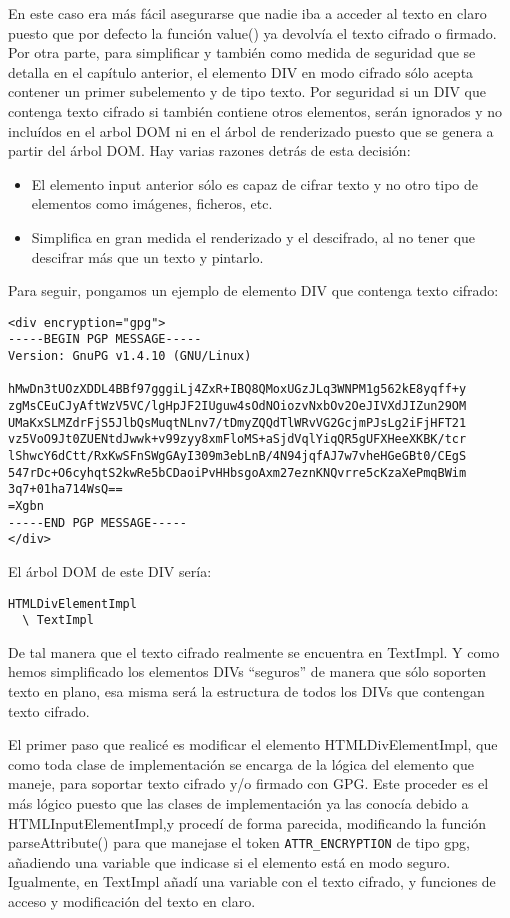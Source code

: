 En este caso era más fácil asegurarse que nadie iba a acceder al texto en claro puesto que por defecto la función value() ya devolvía el texto cifrado o firmado. Por otra parte, para simplificar y también como medida de seguridad que se detalla en el capítulo anterior, el elemento DIV en modo cifrado sólo acepta contener un primer subelemento y de tipo texto. Por seguridad si un DIV que contenga texto cifrado si también contiene otros elementos, serán ignorados y no incluídos en el arbol DOM ni en el árbol de renderizado puesto que se genera a partir del árbol DOM. Hay varias razones detrás de esta decisión:

\begin{itemize}
 \item El elemento input anterior sólo es capaz de cifrar texto y no otro tipo de elementos como imágenes, ficheros, etc.
 \item Simplifica en gran medida el renderizado y el descifrado, al no tener que descifrar más que un texto y pintarlo.
\end{itemize}

Para seguir, pongamos un ejemplo de elemento DIV que contenga texto cifrado:

\begin{verbatim}
<div encryption="gpg">
-----BEGIN PGP MESSAGE-----
Version: GnuPG v1.4.10 (GNU/Linux)

hMwDn3tUOzXDDL4BBf97gggiLj4ZxR+IBQ8QMoxUGzJLq3WNPM1g562kE8yqff+y
zgMsCEuCJyAftWzV5VC/lgHpJF2IUguw4sOdNOiozvNxbOv2OeJIVXdJIZun29OM
UMaKxSLMZdrFjS5JlbQsMuqtNLnv7/tDmyZQQdTlWRvVG2GcjmPJsLg2iFjHFT21
vz5VoO9Jt0ZUENtdJwwk+v99zyy8xmFloMS+aSjdVqlYiqQR5gUFXHeeXKBK/tcr
lShwcY6dCtt/RxKwSFnSWgGAyI309m3ebLnB/4N94jqfAJ7w7vheHGeGBt0/CEgS
547rDc+O6cyhqtS2kwRe5bCDaoiPvHHbsgoAxm27eznKNQvrre5cKzaXePmqBWim
3q7+01ha714WsQ==
=Xgbn
-----END PGP MESSAGE-----
</div>
\end{verbatim} 

El árbol DOM de este DIV sería:

\begin{verbatim}
HTMLDivElementImpl
  \ TextImpl
\end{verbatim}

De tal manera que el texto cifrado realmente se encuentra en TextImpl. Y como hemos simplificado los elementos DIVs ``seguros'' de manera que sólo soporten texto en plano, esa misma será la estructura de todos los DIVs que contengan texto cifrado.

El primer paso que realicé es modificar el elemento HTMLDivElementImpl, que como toda clase de implementación se encarga de la lógica del elemento que maneje, para soportar texto cifrado y/o firmado con GPG. Este proceder es el más lógico puesto que las clases de implementación ya las conocía debido a HTMLInputElementImpl,y procedí de forma parecida, modificando la función parseAttribute() para que manejase el token \verb|ATTR_ENCRYPTION| de tipo gpg, añadiendo una variable que indicase si el elemento está en modo seguro. Igualmente, en TextImpl añadí una variable con el texto cifrado, y funciones de acceso y modificación del texto en claro.


